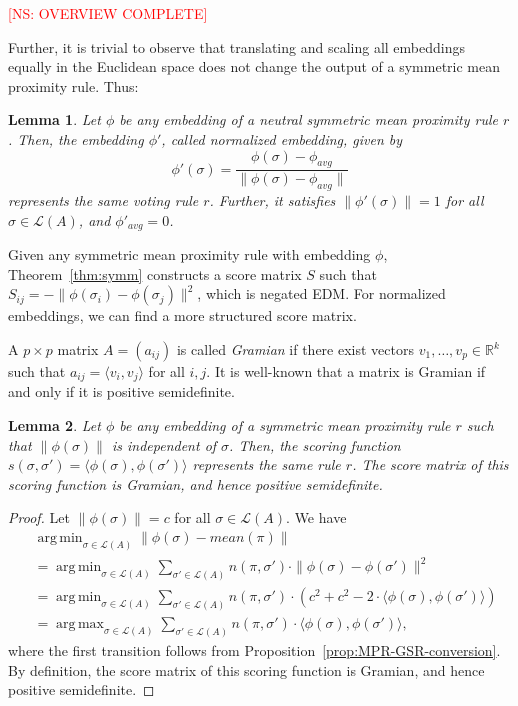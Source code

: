 \documentclass[10pt,letterpaper]{article}
\newcommand{\calL}{{\mathcal{L}}}
\newcommand{\rank}{{\calL(A)}}
\DeclareMathOperator*{\argmax}{arg\,max}
\DeclareMathOperator*{\argmin}{arg\,min}
\newtheorem{lemma}{Lemma}
\newenvironment{definition}[1][Definition]{\begin{trivlist}
\item[\hskip \labelsep {\bfseries #1}]}{\end{trivlist}}
\newcommand{\kibitz}[2]{\ifnum\Comments=1\textcolor{#1}{#2}\fi}
\newcommand{\cns}[1]{\kibitz{red} {[NS: #1]}}
\begin{document}
\cns{OVERVIEW COMPLETE}


Further, it is trivial to observe that translating and scaling all embeddings equally in the Euclidean space does not change the output of a symmetric mean proximity rule. Thus:
\begin{lemma}
Let $\phi$ be any embedding of a neutral symmetric mean proximity rule $r$. Then, the embedding $\phi'$, called \emph{normalized embedding}, given by
$$
\phi'(\sigma) = \frac{\phi(\sigma)-\phi_{avg}}{\|\phi(\sigma)-\phi_{avg}\|}
$$
represents the same voting rule $r$. Further, it satisfies $\|\phi'(\sigma)\| = 1$ for all $\sigma \in \rank$, and $\phi'_{avg} = 0$.
\label{lem:normalized-embedding}
\end{lemma}


Given any symmetric mean proximity rule with embedding $\phi$, Theorem~\ref{thm:symm} constructs a score matrix $S$ such that $S_{ij} = -\|\phi(\sigma_i)-\phi(\sigma_j)\|^2$, which is negated EDM. For normalized embeddings, we can find a more structured score matrix.

\begin{definition}[Gramian Matrix]
A $p \times p$ matrix $A = (a_{ij})$ is called \emph{Gramian} if there exist vectors $v_1,\ldots,v_p \in \mathbb{R}^k$ such that $a_{ij} = \langle v_i,v_j \rangle$ for all $i,j$. It is well-known that a matrix is Gramian if and only if it is positive semidefinite. 
\end{definition}

\begin{lemma}
Let $\phi$ be any embedding of a symmetric mean proximity rule $r$ such that $\|\phi(\sigma)\|$ is independent of $\sigma$. Then, the scoring function $s(\sigma,\sigma') = \langle \phi(\sigma),\phi(\sigma') \rangle$ represents the same rule $r$. The score matrix of this scoring function is Gramian, and hence positive semidefinite.
\label{lem:score-inner-products}
\end{lemma}
\begin{proof}
Let $\|\phi(\sigma)\| = c$ for all $\sigma \in \rank$. We have
\begin{align*}
&\argmin_{\sigma \in \rank} \|\phi(\sigma)-mean(\pi)\| \\
&= \argmin_{\sigma \in \rank} \sum_{\sigma' \in \rank} n(\pi,\sigma') \cdot \|\phi(\sigma)-\phi(\sigma')\|^2 \\
&= \argmin_{\sigma \in \rank} \sum_{\sigma' \in \rank} n(\pi,\sigma') \cdot \left( c^2 + c^2 - 2 \cdot \langle \phi(\sigma), \phi(\sigma') \rangle \right)\\
&= \argmax_{\sigma \in \rank} \sum_{\sigma' \in \rank} n(\pi,\sigma') \cdot \langle \phi(\sigma),\phi(\sigma') \rangle,
\end{align*}
where the first transition follows from Proposition~\ref{prop:MPR-GSR-conversion}. By definition, the score matrix of this scoring function is Gramian, and hence positive semidefinite.
\end{proof}
\end{document}
